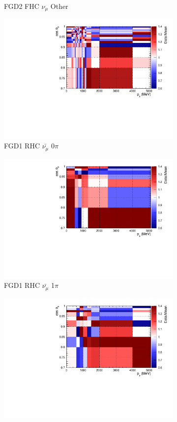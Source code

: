\begin{figure}
\begin{subfigure}{.32\textwidth}
  \caption{FGD2 FHC $\nu_{\mu}$ Other}
  \label{fig:postpred_FGD2_numuCC_other}
\end{subfigure}
\centering
\begin{subfigure}{.32\textwidth}
  \centering
  \includegraphics[width=0.85\linewidth]{figs/postpred_FGD1_anti-numuCC_0pi.pdf}
  \caption{FGD1 RHC $\bar{\nu_{\mu}}$ 0$\pi$}
  \label{fig:postpred_FGD1_anti-numuCC_0pi}
\end{subfigure}
\begin{subfigure}{.32\textwidth}
  \centering
  \includegraphics[width=0.85\linewidth]{figs/postpred_FGD1_anti-numuCC_1pi.pdf}
  \caption{FGD1 RHC $\bar{\nu_{\mu}}$ 1$\pi$}
  \label{fig:postpred_FGD1_anti-numuCC_1pi}
\end{subfigure}
\begin{subfigure}{.32\textwidth}
  \centering
  \includegraphics[width=0.85\linewidth]{figs/postpred_FGD1_anti-numuCC_other.pdf}

\end{subfigure}
\end{figure}
